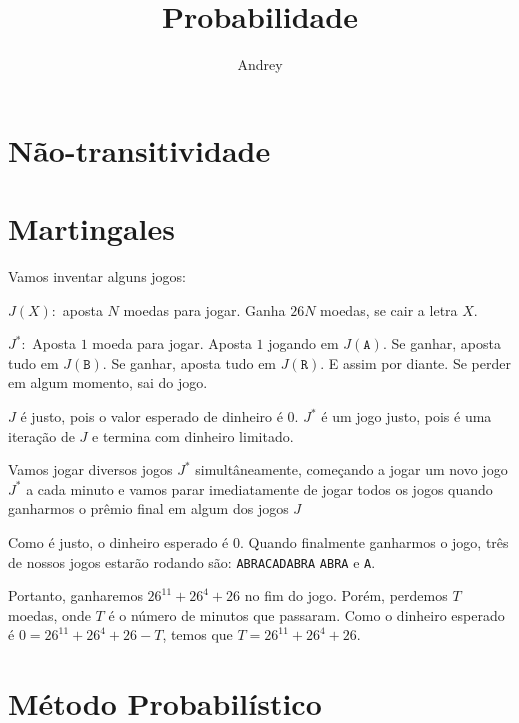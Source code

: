 \documentclass[10pt, a4paper]{article}
\title{Probabilidade}
\author{Andrey}
\begin{document}
	
	\zeustitle
	\section{Não-transitividade}
	\section{Martingales}
	\begin{sol}
		Vamos inventar alguns jogos:

		$J(X):$ aposta $N$ moedas para jogar. Ganha $26N$ moedas, se cair a letra $X$.
		
		$J^*:$ Aposta $1$ moeda para jogar. Aposta $1$ jogando em $J(\mathtt{A})$. Se ganhar, aposta tudo em $J(\mathtt{B})$. Se ganhar, aposta tudo em $J(\mathtt{R})$. E assim por diante. Se perder em algum momento, sai do jogo.

		$J$ é justo, pois o valor esperado de dinheiro é 0. $J^*$ é um jogo justo, pois é uma iteração de $J$ e termina com dinheiro limitado.
		
		Vamos jogar diversos jogos $J^*$ simultâneamente, começando a jogar um novo jogo $J^*$ a cada minuto e vamos parar imediatamente de jogar todos os jogos quando ganharmos o prêmio final em algum dos jogos $J$

		Como é justo, o dinheiro esperado é $0$. Quando finalmente ganharmos o jogo, três de nossos jogos estarão rodando são: \texttt{ABRACADABRA} \texttt{ABRA} e \texttt{A}.

		Portanto, ganharemos $26^{11} + 26^4 + 26$ no fim do jogo. Porém, perdemos $T$ moedas, onde $T$ é o número de minutos que passaram. Como o dinheiro esperado é $0 = 26^{11} + 26^4 + 26 - T$, temos que $T = 26^{11} + 26^4 + 26$.

			
	\end{sol}
	\section{Método Probabilístico}
\end{document}
